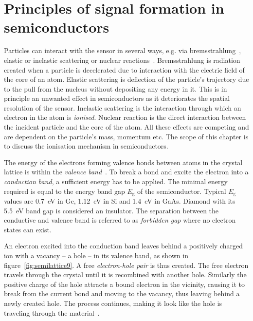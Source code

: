 \section{Principles of signal formation in semiconductors}
\label{sec:princsigfor}
Particles can interact with the sensor in several ways, e.g. via bremsstrahlung~\cite{}, elastic or inelastic scattering or nuclear reactions~\cite{}. Bremsstrahlung is radiation created when a particle is decelerated due to interaction with the electric field of the core of an atom. Elastic scattering is deflection of the particle's trajectory due to the pull from the nucleus without depositing any energy in it. This is in principle an unwanted effect in semiconductors as it deteriorates the spatial resolution of the sensor. Inelastic scattering is the interaction through which an electron in the atom is \emph{ionised}. Nuclear reaction is the direct interaction between the incident particle and the core of the atom. All these effects are competing and are dependent on the particle's mass, momentum etc. The scope of this chapter is to discuss the ionisation mechanism in semiconductors.

The energy of the electrons forming valence bonds between atoms in the crystal lattice is within the \emph{valence band}~\cite{}. To break a bond and excite the electron into a \emph{conduction band}, a sufficient energy has to be applied. The minimal energy required is equal to the energy band gap $E_\mathrm{g}$ of the semiconductor. Typical $E_\mathrm{g}$ values are 0.7~eV in Ge, 1.12~eV in Si and 1.4~eV in GaAs. Diamond with its 5.5~eV band gap is considered an insulator. The separation between the conductive and valence band is referred to as \emph{forbidden gap} where no electron states can exist.

An electron excited into the conduction band leaves behind a positively charged ion with a vacancy -- a hole -- in its valence band, as shown in figure~\ref{fig:semilattice9}. A free \emph{electron-hole pair} is thus created. The free electron travels through the crystal until it is recombined with another hole. Similarly the positive charge of the hole attracts a bound electron in the vicinity, causing it to break from the current bond and moving to the vacancy, thus leaving behind a newly created hole. The process continues, making it look like the hole is traveling through the material~\cite{}. 

